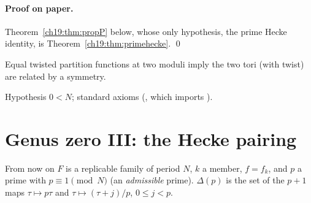 \paragraph{Proof on paper.}  Theorem~\ref{ch19:thm:propP} below, whose only hypothesis, the prime Hecke identity, is
Theorem~\ref{ch19:thm:primehecke}. \qed
\begin{physics}Equal twisted partition functions at two moduli imply the two tori (with twist) are related by a symmetry.\end{physics}
\begin{status}Hypothesis $0<N$; standard axioms (, which imports
).\end{status}

\section{Genus zero III: the Hecke pairing}\label{ch19:sec:pairing}

From now on $F$ is a replicable family of period $N$, $k$ a member, $f=f_k$, and $p$ a prime with $p\equiv1\pmod N$ (an
\emph{admissible} prime).  $\Delta(p)$ is the set of the $p+1$ maps $\tau\mapsto p\tau$ and $\tau\mapsto(\tau+j)/p$, $0\le j<p$.

